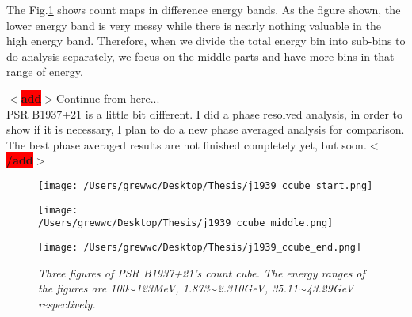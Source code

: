 \documentclass[12pt]{report}
\newcommand{\mycaption}[1]{\caption{\textit{\footnotesize #1}}}
\newcommand{\add}[1]{
  $<$\colorbox{red}{\textbf{add}}$>$#1$<$\colorbox{red}{\textbf{/add}}$>$
}
\begin{document}
          The Fig.\ref{fig: j1939_count_cube} shows count maps in difference energy bands. As 
          the figure shown, the lower energy band is very messy while there is nearly nothing 
          valuable in the high energy band. Therefore, when we divide the total energy bin into 
          sub-bins to do analysis separately, we focus on the middle parts and have more bins
          in that range of energy.

          \add{Continue from here... \\
            PSR B1937+21 is a little bit different. I did a phase resolved analysis, 
            in order to show if it is necessary, I plan to do a new phase averaged analysis for 
            comparison. The best phase averaged results are not finished completely yet, but soon.}
          \begin{figure}[!ht]
            \begin{minipage}{0.32\textwidth}
              \begin{center} 
                \texttt{[image: /Users/grewwc/Desktop/Thesis/j1939\_ccube\_start.png]}
              \end{center}
            \end{minipage}
            \begin{minipage}{0.32\textwidth}
              \begin{center}
                \texttt{[image: /Users/grewwc/Desktop/Thesis/j1939\_ccube\_middle.png]}
              \end{center}
            \end{minipage}
            \begin{minipage}{0.32\textwidth}
              \begin{center}
              \texttt{[image: /Users/grewwc/Desktop/Thesis/j1939\_ccube\_end.png]}
              \end{center}
            \end{minipage}
            \mycaption{Three figures of PSR B1937+21's count cube. The energy ranges of the figures 
            are 100$\sim$123MeV, 1.873$\sim$2.310GeV, 35.11$\sim$43.29GeV respectively.}
            \label{fig: j1939_count_cube}
          \end{figure}
          \vspace{0.5cm}
\end{document}
